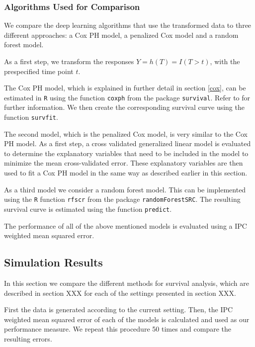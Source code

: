 \documentclass[12pt, a4paper]{article}
\theoremstyle{definition}
\theoremstyle{plain}
\numberwithin{equation}{section}
\numberwithin{figure}{section}
\numberwithin{table}{section}
\begin{document}
	\subsubsection{Algorithms Used for Comparison}
	
	We compare the deep learning algorithms that use the transformed data to three different approaches: a Cox PH model, a penalized Cox model and a random forest model.
	
	As a first step, we transform the responses $Y=h(T)=I(T>t)$, with the prespecified time point $t$.
	
	The Cox PH model, which is explained in further detail in section \ref{cox}, can be estimated in \texttt{R} using the function \texttt{coxph} from the package \texttt{survival}.
	Refer to \citet*{survival} for further information.
	We then create the corresponding survival curve using the function \texttt{survfit}.
	
	The second model, which is the penalized Cox model, is very similar to the Cox PH model.
	As a first step, a cross validated generalized linear model is evaluated to determine the explanatory variables that need to be included in the model to minimize the mean cross-validated error.
	These explanatory variables are then used to fit a Cox PH model in the same way as described earlier in this section.
	
	As a third model we consider a random forest model.
	This can be implemented using the \texttt{R} function \texttt{rfscr} from the package \texttt{randomForestSRC}.
	The resulting survival curve is estimated using the function \texttt{predict}.
	
	The performance of all of the above mentioned models is evaluated using a IPC weighted mean squared error.
	
	\subsection{Simulation Results}
	In this section we compare the different methods for survival analysis, which are described in section XXX for each of the settings presented in section XXX.
	
	First the data is generated according to the current setting.
	Then, the IPC weighted mean squared error of each of the models is calculated and used as our performance measure.
	We repeat this procedure 50 times and compare the resulting errors.
	
	
	
\end{document}
